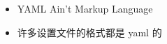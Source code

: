 
\begin{issues}
\issueDraft
\end{issues}

\begin{itemize}
\item YAML Ain't Markup Language
\item 许多设置文件的格式都是 yaml 的
\end{itemize}
